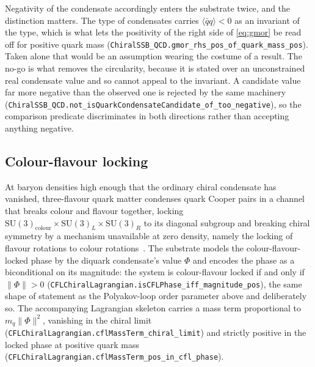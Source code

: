 \documentclass[aps,prd,nofootinbib,superscriptaddress,12pt]{revtex4-2}
\DeclareRobustCommand{\lb}{\discretionary{}{}{}}
\begin{document}
Negativity of the condensate accordingly enters the substrate twice, and the
distinction matters. The type of condensates carries $\langle \bar q q\rangle <
0$ as an invariant of the type, which is what lets the positivity of the right
side of \eqref{eq:gmor} be read off for positive quark mass
(\texttt{Chiral\lb{}SSB\_\lb{}QCD.\lb{}gmor\_\lb{}rhs\_\lb{}pos\_\lb{}of\_\lb{}quark\_\lb{}mass\_\lb{}pos}). Taken alone that
would be an assumption wearing the costume of a result. The no-go is what
removes the circularity, because it is stated over an unconstrained real
condensate value and so cannot appeal to the invariant. A candidate value far
more negative than the observed one is rejected by the same machinery
(\texttt{Chiral\lb{}SSB\_\lb{}QCD.\lb{}not\_\lb{}is\lb{}Quark\lb{}Condensate\lb{}Candidate\_\lb{}of\_\lb{}too\_\lb{}negative}), so
the comparison predicate discriminates in both directions rather than accepting
anything negative.

\subsection{Colour-flavour locking}

At baryon densities high enough that the ordinary chiral condensate has
vanished, three-flavour quark matter condenses quark Cooper pairs in a channel
that breaks colour and flavour together, locking
$\mathrm{SU}(3)_{\mathrm{colour}} \times \mathrm{SU}(3)_L \times
\mathrm{SU}(3)_R$ to its diagonal subgroup and breaking chiral symmetry by a
mechanism unavailable at zero density, namely the locking of flavour rotations
to colour rotations~\cite[Eq.~(2.1) and \S2]{AlfordRajagopalWilczek1999}. The
substrate models the colour-flavour-locked phase by the diquark condensate's
value $\Phi$ and encodes the phase as a biconditional on its magnitude: the
system is colour-flavour locked if and only if $\lVert \Phi \rVert > 0$
(\texttt{CFLChiral\lb{}Lagrangian.\lb{}is\lb{}CFLPhase\_\lb{}iff\_\lb{}magnitude\_\lb{}pos}), the same shape
of statement as the Polyakov-loop order parameter above and deliberately so.
The accompanying Lagrangian skeleton carries a mass term proportional to
$m_q \lVert \Phi \rVert^2$, vanishing in the chiral limit
(\texttt{CFLChiral\lb{}Lagrangian.\lb{}cfl\lb{}Mass\lb{}Term\_\lb{}chiral\_\lb{}limit}) and strictly positive
in the locked phase at positive quark mass
(\texttt{CFLChiral\lb{}Lagrangian.\lb{}cfl\lb{}Mass\lb{}Term\_\lb{}pos\_\lb{}in\_\lb{}cfl\_\lb{}phase}).
\end{document}
